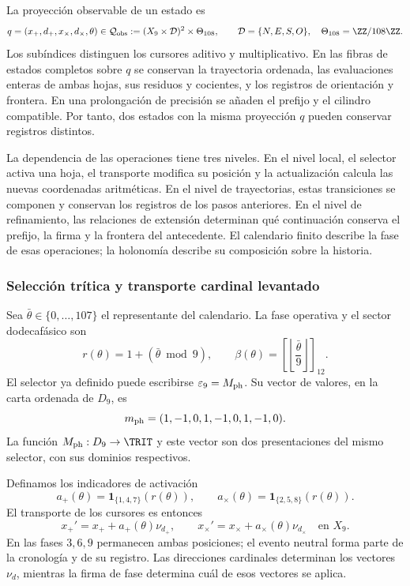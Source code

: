 La proyección observable de un estado es
\begin{equation}
 q=(x_+,d_+,x_\times,d_\times,\theta)
 \in\mathcal Q_{\rm obs}
 :=(X_9\times\mathcal D)^2\times\Theta_{108},
 \qquad \mathcal D=\{N,E,S,O\},\quad
 \Theta_{108}=\ZZ/108\ZZ.
 \label{x_reciprocidad:tpk-int:qobs}
\end{equation}
Los subíndices distinguen los cursores aditivo y multiplicativo. En las
fibras de estados completos sobre \(q\) se conservan la trayectoria ordenada, las evaluaciones
enteras de ambas hojas, sus residuos y cocientes, y los registros de
orientación y frontera. En una prolongación de precisión se añaden el
prefijo y el cilindro compatible. Por tanto, dos estados con la misma
proyección \(q\) pueden conservar registros distintos.

La dependencia de las operaciones tiene tres niveles. En el nivel local,
el selector activa una hoja, el transporte modifica su posición y la
actualización calcula las nuevas coordenadas aritméticas. En el nivel de
trayectorias, estas transiciones se componen y conservan los registros de
los pasos anteriores. En el nivel de refinamiento, las relaciones de
extensión determinan qué continuación conserva el prefijo, la firma y la
frontera del antecedente. El calendario finito describe la fase de esas
operaciones; la holonomía describe su composición sobre la historia.

\subsubsection{Selección trítica y transporte cardinal levantado}
\label{x_reciprocidad:tpk-int:seleccion}

Sea \(\bar\theta\in\{0,\ldots,107\}\) el representante del calendario.
La fase operativa y el sector dodecafásico son
\begin{equation}
 r(\theta)=1+(\bar\theta\bmod9),\qquad
 \beta(\theta)=\left[\left\lfloor\frac{\bar\theta}{9}\right\rfloor\right]_{12}.
 \label{x_reciprocidad:tpk-int:fase}
\end{equation}
El selector ya definido puede escribirse \(\varepsilon_9=M_{\rm ph}\).
Su vector de valores, en la carta ordenada de \(D_9\), es
\[
 m_{\rm ph}=(1,-1,0,1,-1,0,1,-1,0).
\]
La función \(M_{\rm ph}:D_9\to\TRIT\) y este vector son dos
presentaciones del mismo selector, con sus dominios respectivos.

Definamos los indicadores de activación
\[
 a_+(\theta)=\mathbf1_{\{1,4,7\}}(r(\theta)),\qquad
 a_\times(\theta)=\mathbf1_{\{2,5,8\}}(r(\theta)).
\]
El transporte de los cursores es entonces
\begin{equation}
 x_+'=x_++a_+(\theta)\nu_{d_+},\qquad
 x_\times'=x_\times+a_\times(\theta)\nu_{d_\times}
 \quad\text{en }X_9.
 \label{x_reciprocidad:tpk-int:cursores}
\end{equation}
En las fases \(3,6,9\) permanecen ambas posiciones; el evento neutral
forma parte de la cronología y de su registro. Las direcciones cardinales
determinan los vectores \(\nu_d\), mientras la firma de fase determina
cuál de esos vectores se aplica.

